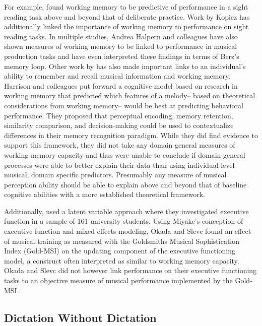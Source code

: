 \documentclass[12pt,]{book}
\begin{document}
For example, \citet{meinzDeliberatePracticeNecessary2010} found working memory to be predictive of performance in a sight reading task above and beyond that of deliberate practice.
Work by Kopiez \citep{kopiezDynamicModelSkills2006, kopiezGeneralModelSkills2008} has additionally linked the importance of working memory to performance on sight reading tasks.
In multiple studies, Andrea Halpern and colleagues have also shown measures of working memory to be linked to performance in musical production tasks \citep{halpernEffectsTimbreTempo2008, nicholsScoreOneJazz2018} and have even interpreted these findings in terms of Berz's memory loop.
Other work by \citet{harrisonModellingMelodicDiscrimination2016} has also made important links to an individual's ability to remember and recall musical information and working memory.
Harrison and colleagues put forward a cognitive model based on research in working memory that predicted which features of a melody-- based on theoretical considerations from working memory-- would be best at predicting behavioral performance.
They proposed that perceptual encoding, memory retention, similarity comparison, and decision-making could be used to contextualize differences in their memory recognition paradigm.
While they did find evidence to support this framework, they did not take any domain general measures of working memory capacity and thus were unable to conclude if domain general processes were able to better explain their data than using individual level musical, domain specific predictors.
Presumably any measure of musical perception ability should be able to explain above and beyond that of baseline cognitive abilities with a more established theoretical framework.

Additionally, \citet{okadaIndividualDifferencesMusical2018} used a latent variable approach where they investigated executive function in a sample of 161 university students.
Using Miyake's conception of executive function \citep{miyakeNatureOrganizationIndividual2012, miyakeUnityDiversityExecutive2000} and mixed effects modeling, Okada and Slevc found an effect of musical training as measured with the Goldsmiths Musical Sophistication Index (Gold-MSI) on the updating component of the executive functioning model, a construct often interpreted as similar to working memory capacity.
Okada and Slevc did not however link performance on their executive functioning tasks to an objective measure of musical performance implemented by the Gold-MSI.

\hypertarget{dictation-without-dictation}{%
\subsection{Dictation Without Dictation}\label{dictation-without-dictation}}
\end{document}
